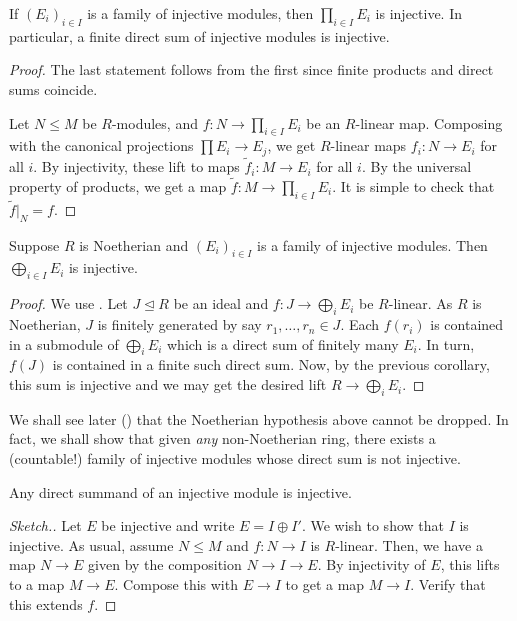 \begin{prop} \label{prop:direct-product-injectives}
	If $(E_{i})_{i \in I}$ is a family of injective modules, then $\prod_{i \in I} E_{i}$ is injective. In particular, a finite direct sum of injective modules is injective.
\end{prop}
\begin{proof} 
	The last statement follows from the first since finite products and direct sums coincide.

	Let $N \le M$ be $R$-modules, and $f : N \to \prod_{i \in I} E_{i}$ be an $R$-linear map. Composing with the canonical projections $\prod E_{i} \to E_{j}$, we get $R$-linear maps $f_{i} : N \to E_{i}$ for all $i$. By injectivity, these lift to maps $\widetilde{f}_{i} : M \to E_{i}$ for all $i$. By the universal property of products, we get a map $\widetilde{f} : M \to \prod_{i \in I} E_{i}$. It is simple to check that $\widetilde{f}|_{N} = f$.
\end{proof}

\begin{prop} \label{prop:direct-sum-injectives-noetherian}
	Suppose $R$ is Noetherian and $(E_{i})_{i \in I}$ is a family of injective modules. Then $\bigoplus_{i \in I} E_{i}$ is injective.
\end{prop}
\begin{proof} 
	We use . Let $J \unlhd R$ be an ideal and $f : J \to \bigoplus_{i} E_{i}$ be $R$-linear. As $R$ is Noetherian, $J$ is finitely generated by say $r_{1}, \ldots, r_{n} \in J$. Each $f(r_{i})$ is contained in a submodule of $\bigoplus_{i} E_{i}$ which is a direct sum of finitely many $E_{i}$. In turn, $f(J)$ is contained in a finite such direct sum. Now, by the previous corollary, this sum is injective and we may get the desired lift $R \to \bigoplus_{i} E_{i}$.
\end{proof}

\begin{rem}
	We shall see later () that the Noetherian hypothesis above cannot be dropped. In fact, we shall show that given \emph{any} non-Noetherian ring, there exists a (countable!) family of injective modules whose direct sum is not injective.
\end{rem}

\begin{prop} \label{prop:direct-summand-injective}
	Any direct summand of an injective module is injective.
\end{prop}
\begin{proof}[Sketch.]
	Let $E$ be injective and write $E = I \oplus I'$. We wish to show that $I$ is injective. As usual, assume $N \le M$ and $f : N \to I$ is $R$-linear. Then, we have a map $N \to E$ given by the composition $N \to I \to E$. By injectivity of $E$, this lifts to a map $M \to E$. Compose this with $E \to I$ to get a map $M \to I$. Verify that this extends $f$.
\end{proof}

